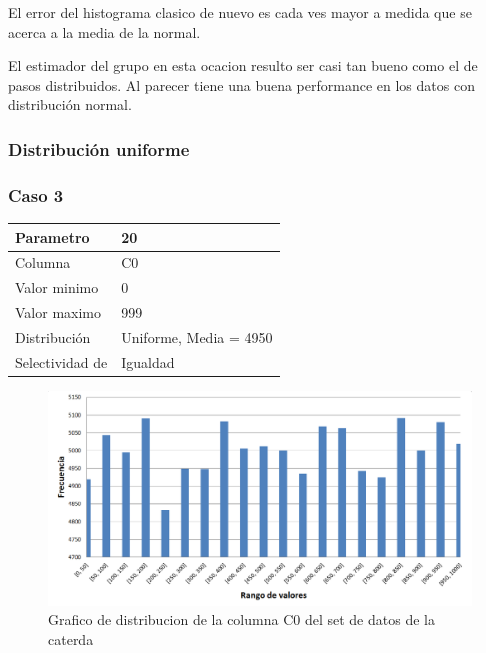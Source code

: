 		El error del histograma clasico de nuevo es cada ves mayor a medida que se acerca a la media de la normal. 
		
		El estimador del grupo en esta ocacion resulto ser casi tan bueno como el de pasos distribuidos. Al parecer tiene una buena performance en los datos con distribuci\'on normal.

	\subsubsection{Distribuci\'on uniforme}	

\subsubsection*{Caso 3}
		
		\begin{tabular}{| l | l |}
		\hline
		Parametro & 20 \\
		\hline
		Columna & C0 \\
		\hline
		Valor minimo & 0 \\
		\hline
		Valor maximo & 999 \\
		\hline
		Distribuci\'on & Uniforme, Media = 4950 \\
		\hline
		Selectividad de & Igualdad \\
		\hline
		\end{tabular}		

		\newpage							
	\begin{figure}[H]
	  \begin{center}
	    \includegraphics[scale=.50]{imagenes/distro_C0.png}
	    \caption{Grafico de distribucion de la columna C0 del set de datos de la caterda} 
	    \label{fig:(distro_C0}
	  \end{center}
	\end{figure}

